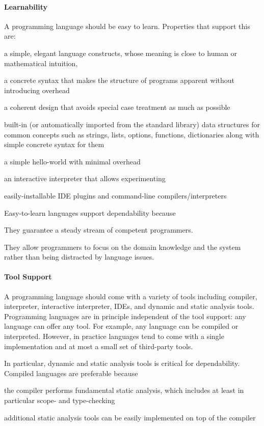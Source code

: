 \paragraph{Learnability}
A programming language should be easy to learn.
Properties that support this are:
\begin{compactitem}
\item a simple, elegant language constructs, whose meaning is close to human or mathematical intuition,
\item a concrete syntax that makes the structure of programs apparent without introducing overhead
\item a coherent design that avoids special case treatment as much as possible
\item built-in (or automatically imported from the standard library) data structures for common concepts such as strings, lists, options, functions, dictionaries along with simple concrete syntax for them
\item a simple hello-world with minimal overhead
\item an interactive interpreter that allows experimenting
\item easily-installable IDE plugins and command-line compilers/interpreters
\end{compactitem}

Easy-to-learn languages support dependability because
\begin{compactitem}
 \item They guarantee a steady stream of competent programmers.
 \item They allow programmers to focus on the domain knowledge and the system rather than being distracted by language issues.
\end{compactitem}

\paragraph{Tool Support}
A programming language should come with a variety of tools including compiler, interpreter, interactive interpreter, IDEs, and dynamic and static analysis tools.
Programming languages are in principle independent of the tool support: any language can offer any tool.
For example, any language can be compiled or interpreted.
However, in practice languages tend to come with a single implementation and at most a small set of third-party tools.

In particular, dynamic and static analysis tools is critical for dependability.
Compiled languages are preferable because
\begin{compactitem}
 \item the compiler performs fundamental static analysis, which includes at least in particular scope- and type-checking
 \item additional static analysis tools can be easily implemented on top of the compiler
\end{compactitem}

